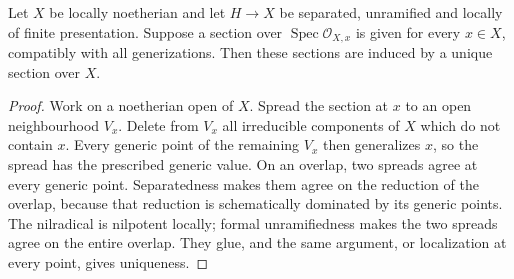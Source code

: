 \begin{lemma}
\label{lem:C-RD8-sections}
Let $X$ be locally noetherian and let $H\to X$ be separated,
unramified and locally of finite presentation. Suppose a section over
$\operatorname{Spec}\mathcal O_{X,x}$ is given for every $x\in X$,
compatibly with all generizations. Then these sections are induced by
a unique section over $X$.
\end{lemma}
\begin{proof}
Work on a noetherian open of $X$. Spread the section at $x$ to an open
neighbourhood $V_x$. Delete from $V_x$ all irreducible components of
$X$ which do not contain $x$. Every generic point of the remaining
$V_x$ then generalizes $x$, so the spread has the prescribed generic
value. On an overlap, two spreads agree at every generic point.
Separatedness makes them agree on the reduction of the overlap,
because that reduction is schematically dominated by its generic
points. The nilradical is nilpotent locally; formal unramifiedness
makes the two spreads agree on the entire overlap. They glue, and
the same argument, or localization at every point, gives uniqueness.
\end{proof}

